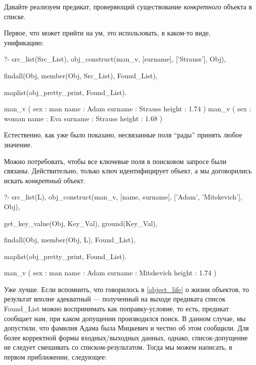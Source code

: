 \documentclass[a4paper]{book}
\begin{document}
Давайте реализуем предикат, проверяющий существование {\it
  конкретного\/} объекта в списке.

Первое, что может прийти на ум, это использовать, в каком-то
виде, унификацию:

\begin{example}{}{}
?- src_list(Src_List),
   obj_construct(man_v, [surname], ['Strauss'], Obj), 

   findall(Obj, member(Obj, Src_List), Found_List), 

   maplist(obj_pretty_print, Found_List).                         

man_v ( 
  sex : man 
  name : Adam 
  surname : Strauss 
  height : 1.74 
) 
man_v ( 
  sex : woman 
  name : Eva 
  surname : Strauss 
  height : 1.68 
) 
\end{example}

Естественно, как уже было показано, несвязанные поля ``рады''
принять любое значение.

Можно потребовать, чтобы все ключевые поля в поисковом запросе
были связаны. Действительно, только ключ идентифицирует объект, а
мы договорились искать {\it конкретный\/} объект.

\begin{example}{}{}
?- src_list(L), 
   obj_construct(man_v, 
      [name, surname], ['Adam', 'Mitskevich'], Obj), 

   get_key_value(Obj, Key_Val), 
   ground(Key_Val), %

   findall(Obj, member(Obj, L), Found_List), 

   maplist(obj_pretty_print, Found_List).

man_v ( 
  sex : man 
  name : Adam 
  surname : Mitskevich 
  height : 1.74 
) 
\end{example}

Уже лучше. Если вспомнить, что говорилось в \ref{object_life} о
жизни объектов, то результат вполне адекватный --- полученный на
выходе предиката список Found_List можно воспринимать как
поправку-условие, то есть, предикат сообщает нам, при каком
допущении производился поиск. В данном случае, мы допустили, что
фамилия Адама была Мицкевич и честно об этом сообщили. Для более
корректной формы входных/выходных данных, однако,
список-допущение не следует смешивать со
списком-результатом. Тогда мы можем написать, в первом
приближении, следующее:
\end{document}
